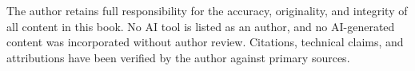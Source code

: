 The author retains full responsibility for the accuracy, originality,
and integrity of all content in this book. No AI tool is listed as an
author, and no AI-generated content was incorporated without author
review. Citations, technical claims, and attributions have been
verified by the author against primary sources.
